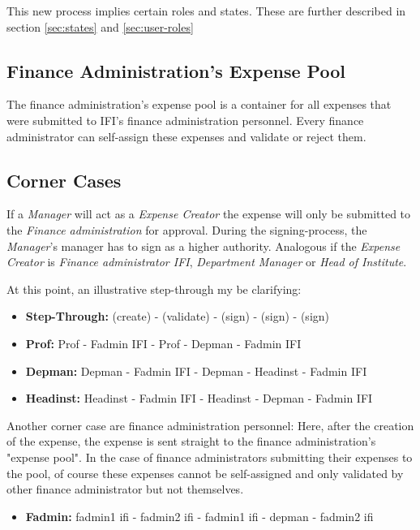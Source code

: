 This new process implies certain roles and states. These are further described in section \ref{sec:states} and \ref{sec:user-roles}
\newline

\subsection{Finance Administration's Expense Pool}
The finance administration's expense pool is a container for all expenses that were submitted to IFI's finance administration personnel. Every finance administrator can self-assign these expenses and validate or reject them.

\subsection{Corner Cases}
If a \textit{Manager} will act as a \textit{Expense Creator} the expense will only be submitted to the \textit{Finance administration} for approval. During the signing-process, the \textit{Manager}'s manager has to sign as a higher authority.\newline
Analogous if the \textit{Expense Creator} is \textit{Finance administrator IFI}, \textit{Department Manager} or \textit{Head of Institute}.\par 
At this point, an illustrative step-through my be clarifying:
	
	\begin{itemize}
		\item \textbf{Step-Through:} (create) - (validate) - (sign) - (sign) - (sign)
		\item \textbf{Prof:} Prof - Fadmin IFI - Prof - Depman - Fadmin IFI
		\item \textbf{Depman:} Depman - Fadmin IFI - Depman - Headinst  - Fadmin IFI
		\item \textbf{Headinst:} Headinst - Fadmin IFI - Headinst - Depman - Fadmin IFI	
	\end{itemize}
	
Another corner case are finance administration personnel: Here, after the creation of the expense, the expense is sent straight to the finance administration's "expense pool". In the case of finance administrators submitting their expenses to the pool, of course these expenses cannot be self-assigned and only validated by other finance administrator but not themselves.

\begin{itemize}
	\item \textbf{Fadmin:} fadmin1 ifi - fadmin2 ifi - fadmin1 ifi - depman - fadmin2 ifi
\end{itemize}


